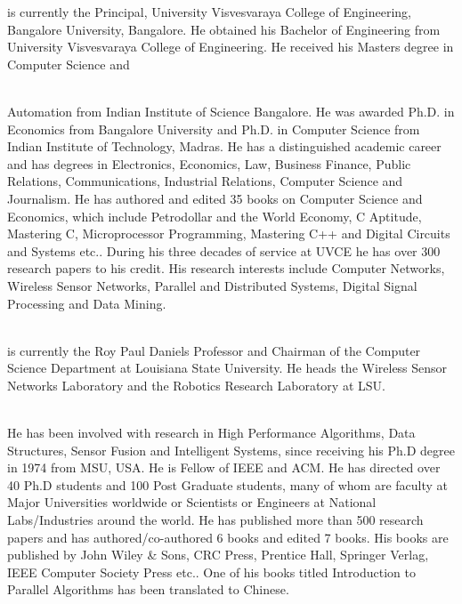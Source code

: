 \documentclass[fleqn,twoside]{article}
\begin{document}
\begin{minipage}[b][1in][c]{1.8in}
{ is currently the Principal, University Visvesvaraya College of Engineering, Bangalore University, Bangalore. He obtained his Bachelor of Engineering from University Visvesvaraya College of Engineering. He received his Masters degree in Computer Science and} \\ \\
\end{minipage}
Automation from Indian Institute of Science Bangalore. He was awarded Ph.D. in Economics from Bangalore University and Ph.D. in Computer Science from Indian Institute of Technology, Madras. He has a distinguished academic career and has degrees in Electronics, Economics, Law, Business Finance, Public Relations, Communications, Industrial Relations, Computer Science and Journalism. He has authored and edited 35 books on Computer Science and Economics, which include Petrodollar and the World Economy, C Aptitude, Mastering C, Microprocessor Programming, Mastering C++ and Digital Circuits and Systems etc.. During his three decades of service at UVCE he has over 300 research papers to his credit. His research interests include Computer Networks, Wireless Sensor Networks, Parallel and Distributed Systems, Digital Signal Processing and Data Mining.\\ \\

\begin{minipage}[b][1in][c]{1.8in}
{ is currently the Roy Paul Daniels Professor and Chairman of the Computer Science Department at Louisiana State University. He heads the Wireless Sensor Networks Laboratory and the Robotics Research Laboratory at LSU.}\\\\
\end{minipage}
He has been involved with research in High Performance Algorithms, Data Structures, Sensor Fusion and Intelligent Systems, since receiving his Ph.D degree in 1974 from MSU, USA. He is Fellow of IEEE and ACM. He has directed over 40 Ph.D students and 100 Post Graduate students, many of whom are faculty at Major Universities worldwide or Scientists or Engineers at National Labs/Industries around the world. He has published more than 500 research papers and has authored/co-authored 6 books and edited 7 books. His books are published by John Wiley \& Sons, CRC Press, Prentice Hall, Springer Verlag, IEEE Computer Society Press etc.. One of his books titled Introduction to Parallel Algorithms has been translated to Chinese.\\\\
\end{document}
